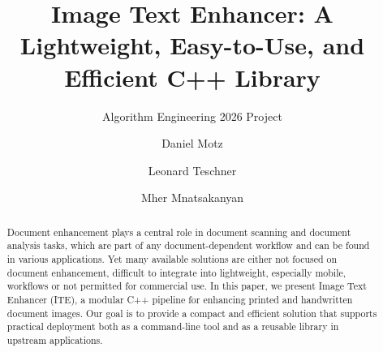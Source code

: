\documentclass[sigconf]{acmart}
\begin{document}
\title{Image Text Enhancer: A Lightweight, Easy-to-Use, and Efficient C++ Library}
\subtitle{\large Algorithm Engineering 2026 Project}


\author{Daniel Motz}

\author{Leonard Teschner}

\author{Mher Mnatsakanyan}

\begin{abstract}
  Document enhancement plays a central role in document scanning and document analysis tasks, which are part of any document-dependent workflow and can be found in various applications. Yet many available solutions are either not focused on document enhancement, difficult to integrate into lightweight, especially mobile, workflows or not permitted for commercial use. In this paper, we present Image Text Enhancer (ITE), a modular C++ pipeline for enhancing printed and handwritten document images. Our goal is to provide a compact and efficient solution that supports practical deployment both as a command-line tool and as a reusable library in upstream applications.
\end{abstract}


\maketitle
\end{document}
